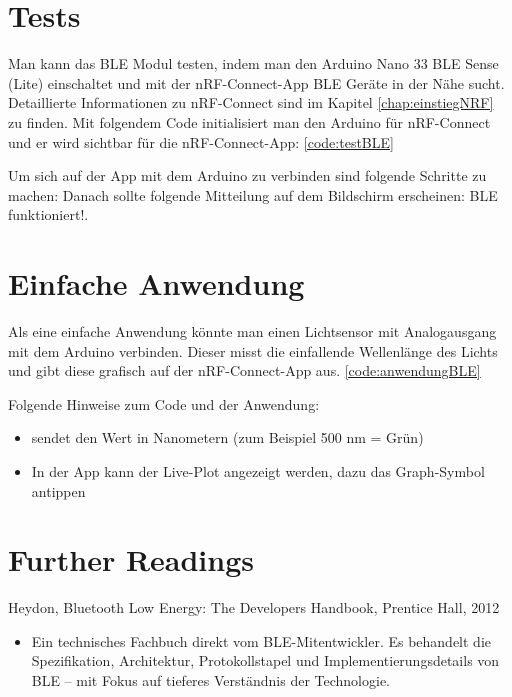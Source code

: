 \section{Tests}
Man kann das BLE Modul testen, indem man den Arduino Nano 33 BLE Sense (Lite) einschaltet und mit der nRF-Connect-App BLE Geräte in der Nähe sucht. Detaillierte Informationen zu nRF-Connect sind im Kapitel \ref{chap:einstiegNRF} zu finden. Mit folgendem Code initialisiert man den Arduino für nRF-Connect und er wird sichtbar für die nRF-Connect-App: \ref{code:testBLE}

\begin{code}[H]
	\caption{Einfacher Code zum Testen von BLE}
	\label{code:testBLE}
\end{code}

Um sich auf der App mit dem Arduino zu verbinden sind folgende Schritte zu machen:
Danach sollte folgende Mitteilung auf dem Bildschirm erscheinen: \glqq BLE funktioniert!\grqq.

\section{Einfache Anwendung}
Als eine einfache Anwendung könnte man einen Lichtsensor mit Analogausgang mit dem Arduino verbinden. Dieser misst die einfallende Wellenlänge des Lichts und gibt diese grafisch auf der nRF-Connect-App aus. \ref{code:anwendungBLE}

\begin{code}[H]
	\caption{Einfache Anwendung für BLE}
	\lstset{breaklines=true, breakatwhitespace=true}
	\label{code:anwendungBLE}
\end{code}

Folgende Hinweise zum Code und der Anwendung:
\begin{itemize}
	\item {} sendet den Wert in Nanometern (zum Beispiel 500 nm = Grün)
	\item In der App kann der Live-Plot angezeigt werden, dazu das Graph-Symbol antippen
\end{itemize}

\section{Further Readings}
Heydon, Bluetooth Low Energy: The Developers Handbook, Prentice Hall, 2012 \cite{Heydon:2012}
\begin{itemize}
	\item Ein technisches Fachbuch direkt vom BLE-Mitentwickler. Es behandelt die Spezifikation, Architektur, Protokollstapel und Implementierungsdetails von BLE – mit Fokus auf tieferes Verständnis der Technologie.
\end{itemize} 